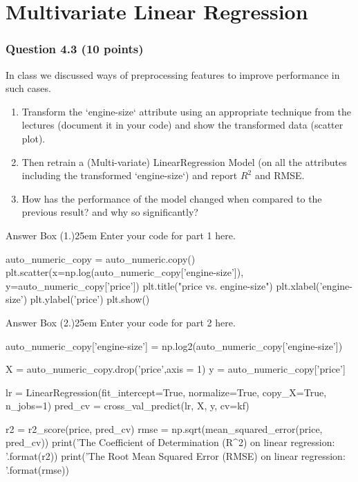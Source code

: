\documentclass[12pt]{article}
\begin{document}




% 


\section*{Multivariate Linear Regression}
\subsubsection*{Question 4.3 (10 points)}
In class we discussed ways of preprocessing features to improve performance in such cases.
\begin{enumerate}
    \item [1.] [Code] Transform the `engine-size` attribute using an appropriate technique from the lectures (document it in your code) and show the transformed data (scatter plot).
    \item [2.] [Code] Then retrain a (Multi-variate) LinearRegression Model (on all the attributes including the transformed `engine-size`) and report $R^2$ and RMSE. 
    \item [3.] [Text] How has the performance of the model changed when compared to the previous result? and why so significantly?
\end{enumerate}

\begin{code}{Answer Box (1.)}{25em}
    Enter your code for part 1 here.

    auto_numeric_copy = auto_numeric.copy()
    plt.scatter(x=np.log(auto_numeric_copy['engine-size']), y=auto_numeric_copy['price'])
    plt.title("price vs. engine-size")
    plt.xlabel('engine-size')
    plt.ylabel('price')
    plt.show()
    
\end{code}


\begin{code}{Answer Box (2.)}{25em}
    Enter your code for part 2 here.

    auto_numeric_copy['engine-size'] = np.log2(auto_numeric_copy['engine-size'])

    X = auto_numeric_copy.drop('price',axis = 1)
    y = auto_numeric_copy['price']

    lr = LinearRegression(fit_intercept=True, normalize=True, copy_X=True, n_jobs=1)
    pred_cv = cross_val_predict(lr, X, y, cv=kf)

    r2 = r2_score(price, pred_cv)
    rmse = np.sqrt(mean_squared_error(price, pred_cv))
    print('The Coefficient of Determination (R^2) on linear regression: {}'.format(r2))
    print('The Root Mean Squared Error (RMSE) on linear regression: {}'.format(rmse))
\end{code}
\end{document}

